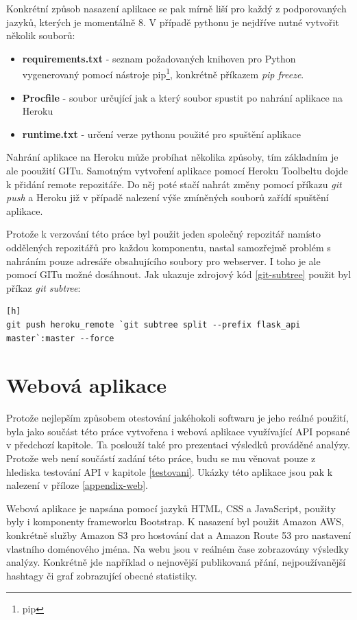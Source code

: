 \documentclass[thesis=B,czech]{FITthesis}[2012/06/26]
\begin{document}
Konkrétní způsob nasazení aplikace se pak mírně liší pro každý z podporovaných jazyků, kterých je momentálně 8. V případě pythonu je nejdříve nutné vytvořit několik souborů:

\begin{itemize}
\item \textbf{requirements.txt} - seznam požadovaných knihoven pro Python vygenerovaný pomocí nástroje pip\footnote{pip}, konkrétně příkazem \textit{pip freeze}.
\item \textbf{Procfile} - soubor určující jak a který soubor spustit po nahrání aplikace na Heroku
\item \textbf{runtime.txt} - určení verze pythonu použité pro spuštění aplikace
\end{itemize}

Nahrání aplikace na Heroku může probíhat několika způsoby, tím základním je ale pooužití GITu. Samotným vytvoření aplikace pomocí Heroku Toolbeltu dojde k přidání remote repozitáře. Do něj poté stačí nahrát změny pomocí příkazu \textit{git push} a Heroku již v případě nalezení výše zmíněných souborů zařídí spuštění aplikace. 

Protože k verzování této práce byl použit jeden společný repozitář namísto oddělených repozitářů pro každou komponentu, nastal samozřejmě problém s nahráním pouze adresáře obsahujícího soubory pro webserver. I toho je ale pomocí GITu možné dosáhnout. Jak ukazuje zdrojový kód \ref{git-subtree} použit byl příkaz \textit{git subtree}:


\begin{lstlisting}[caption={Příkaz pro nahrání podadresáře na Heroku},label=git-subtree][h]
git push heroku_remote `git subtree split --prefix flask_api master`:master --force
\end{lstlisting}



\section{Webová aplikace}
	Protože nejlepším způsobem otestování jakéhokoli softwaru je jeho reálné použití, byla jako součást této práce vytvořena i webová aplikace využívající API popsané v předchozí kapitole. Ta poslouží také pro prezentaci výsledků prováděné analýzy. Protože web není součástí zadání této práce, budu se mu věnovat pouze z hlediska testování API v kapitole \ref{testovani}. Ukázky této aplikace jsou pak k nalezení v příloze \ref{appendix-web}.  
	
	Webová aplikace je napsána pomocí jazyků HTML, CSS a JavaScript, použity byly i komponenty frameworku Bootstrap. K nasazení byl použit Amazon AWS, konkrétně služby Amazon S3 pro hostování dat a Amazon Route 53 pro nastavení vlastního doménového jména. Na webu jsou v reálném čase zobrazovány výsledky analýzy. Konkrétně jde například o nejnovější publikovaná přání, nejpoužívanější hashtagy či graf zobrazující obecné statistiky. 
\end{document}
